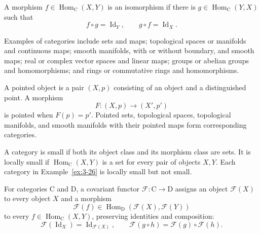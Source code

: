 \begin{definition}
\label{def:3-19-extra-2}



A morphism $f\in\operatorname{Hom}_{\mathrm C}(X,Y)$ is an isomorphism if
there is $g\in\operatorname{Hom}_{\mathrm C}(Y,X)$ such that
\[
f\circ g=\operatorname{Id}_Y,
\qquad g\circ f=\operatorname{Id}_X.
\]
\end{definition}

\begin{example}[Categories]
\label{ex:3-26}




Examples of categories include sets and maps; topological spaces or
manifolds and continuous maps; smooth manifolds, with or without boundary, and
smooth maps; real or complex vector spaces and linear maps; groups or abelian
groups and homomorphisms; and rings or commutative rings and homomorphisms.

A pointed object is a pair $(X,p)$ consisting of an object and a distinguished
point. A morphism
\[
F:(X,p)\longrightarrow(X',p')
\]
is pointed when $F(p)=p'$. Pointed sets, topological spaces, topological
manifolds, and smooth manifolds with their pointed maps form corresponding
categories.
\end{example}

\begin{definition}
\label{def:3-19-extra-3}



A category is small if both its object class and its morphism class are sets.
It is locally small if $\operatorname{Hom}_{\mathrm C}(X,Y)$ is a set for every
pair of objects $X,Y$. Each category in Example~\ref{ex:3-26} is locally small
but not small.
\end{definition}

\begin{definition}
\label{def:3-19-extra-4}



For categories $\mathrm C$ and $\mathrm D$, a covariant functor
$\mathcal F:\mathrm C\to\mathrm D$ assigns an object $\mathcal F(X)$ to every
object $X$ and a morphism
\[
\mathcal F(f)\in
\operatorname{Hom}_{\mathrm D}(\mathcal F(X),\mathcal F(Y))
\]
to every $f\in\operatorname{Hom}_{\mathrm C}(X,Y)$, preserving identities and
composition:
\[
\mathcal F(\operatorname{Id}_X)=\operatorname{Id}_{\mathcal F(X)},
\qquad
\mathcal F(g\circ h)=\mathcal F(g)\circ\mathcal F(h).
\]
\end{definition}

